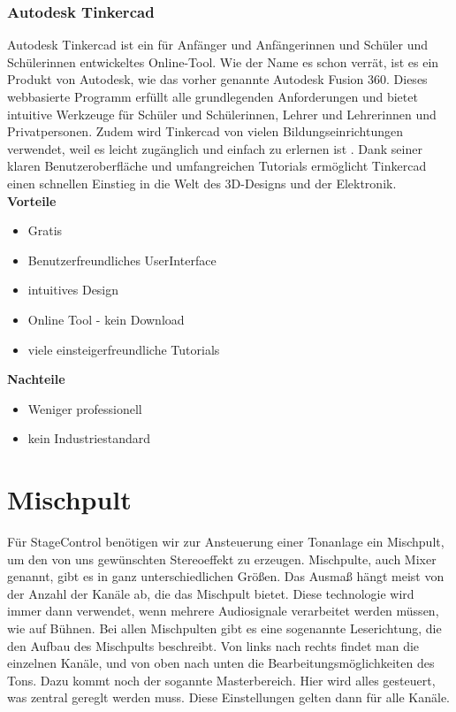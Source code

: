 \subsubsection{Autodesk Tinkercad}
Autodesk Tinkercad ist ein für Anfänger und Anfängerinnen und Schüler und Schülerinnen entwickeltes Online-Tool. Wie der Name es schon verrät, ist es ein Produkt von Autodesk, wie das vorher genannte Autodesk Fusion 360. Dieses webbasierte Programm erfüllt alle grundlegenden Anforderungen und bietet intuitive Werkzeuge für Schüler und Schülerinnen, Lehrer und Lehrerinnen und Privatpersonen. Zudem wird Tinkercad von vielen Bildungseinrichtungen verwendet, weil es leicht zugänglich und einfach zu erlernen ist \parencite{Tinkercad}. Dank seiner klaren Benutzeroberfläche und umfangreichen Tutorials ermöglicht Tinkercad einen schnellen Einstieg in die Welt des 3D-Designs und der Elektronik. \\


\textbf{Vorteile}
\begin{itemize}
	\item Gratis
	\item Benutzerfreundliches UserInterface
	\item intuitives Design
	\item Online Tool - kein Download 	
	\item viele einsteigerfreundliche Tutorials \parencite{TinkercadReviews}
\end{itemize}

\textbf{Nachteile}
\begin{itemize}
	\item Weniger professionell
	\item kein Industriestandard \parencite{TinkercadReviews}
\end{itemize}

\section{Mischpult} \label{Mischpult}
Für StageControl benötigen wir zur Ansteuerung einer Tonanlage ein Mischpult, um den von uns gewünschten Stereoeffekt zu erzeugen. Mischpulte, auch Mixer genannt, gibt es in ganz unterschiedlichen Größen. Das Ausmaß hängt meist von der Anzahl der Kanäle ab, die das Mischpult bietet. Diese technologie wird immer dann verwendet, wenn mehrere Audiosignale verarbeitet werden müssen, wie auf Bühnen. \parencite{MischpultInformation} Bei allen Mischpulten gibt es eine sogenannte Leserichtung, die den Aufbau des Mischpults beschreibt. Von links nach rechts findet man die einzelnen Kanäle, und von oben nach unten die Bearbeitungsmöglichkeiten des Tons. Dazu kommt noch der sogannte Masterbereich. Hier wird alles gesteuert, was zentral gereglt werden muss. Diese Einstellungen gelten dann für alle Kanäle.  \parencite{MischpultMaster} \\


